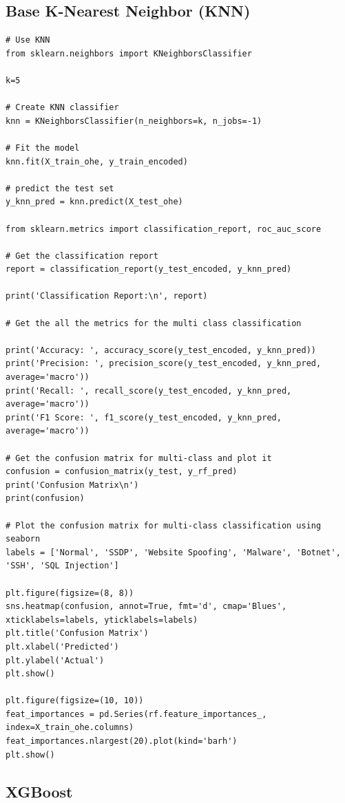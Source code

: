 \begin{appendices}
\subsection{Base K-Nearest Neighbor (KNN)}
\begin{lstlisting}
# Use KNN
from sklearn.neighbors import KNeighborsClassifier

k=5

# Create KNN classifier
knn = KNeighborsClassifier(n_neighbors=k, n_jobs=-1)

# Fit the model
knn.fit(X_train_ohe, y_train_encoded)

# predict the test set
y_knn_pred = knn.predict(X_test_ohe)

from sklearn.metrics import classification_report, roc_auc_score

# Get the classification report
report = classification_report(y_test_encoded, y_knn_pred)

print('Classification Report:\n', report)

# Get the all the metrics for the multi class classification

print('Accuracy: ', accuracy_score(y_test_encoded, y_knn_pred))
print('Precision: ', precision_score(y_test_encoded, y_knn_pred, average='macro'))
print('Recall: ', recall_score(y_test_encoded, y_knn_pred, average='macro'))
print('F1 Score: ', f1_score(y_test_encoded, y_knn_pred, average='macro'))

# Get the confusion matrix for multi-class and plot it
confusion = confusion_matrix(y_test, y_rf_pred)
print('Confusion Matrix\n')
print(confusion)

# Plot the confusion matrix for multi-class classification using seaborn
labels = ['Normal', 'SSDP', 'Website Spoofing', 'Malware', 'Botnet', 'SSH', 'SQL Injection']

plt.figure(figsize=(8, 8))
sns.heatmap(confusion, annot=True, fmt='d', cmap='Blues', xticklabels=labels, yticklabels=labels)
plt.title('Confusion Matrix')
plt.xlabel('Predicted')
plt.ylabel('Actual')
plt.show()

plt.figure(figsize=(10, 10))
feat_importances = pd.Series(rf.feature_importances_, index=X_train_ohe.columns)
feat_importances.nlargest(20).plot(kind='barh')
plt.show()
\end{lstlisting}

\subsection{XGBoost}


\end{appendices}
